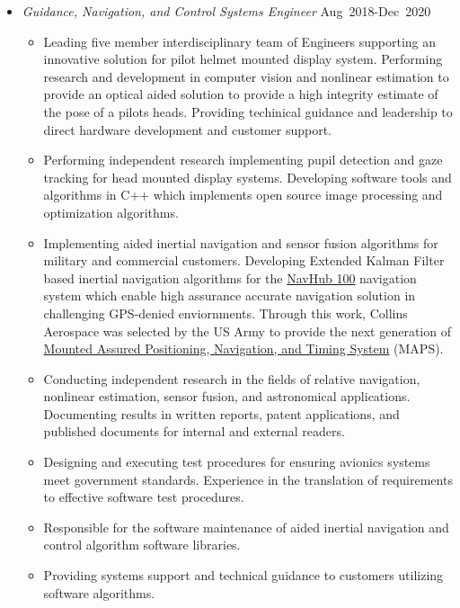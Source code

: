 \begin{itemize}
    \item[] \textit{Guidance, Navigation, and Control Systems Engineer}
                    \hfill {Aug~2018-Dec~2020} 
        \begin{itemize}
            \item Leading five member interdisciplinary team of Engineers supporting an innovative solution for pilot helmet mounted display system. 
                Performing research and development in computer vision and nonlinear estimation to provide an optical aided solution to provide a high integrity estimate of the pose of a pilots heads. 
                Providing techinical guidance and leadership to direct hardware development and customer support.
            \item Performing independent research implementing pupil detection and gaze tracking for head mounted display systems. 
                Developing software tools and algorithms in C++ which implements open source image processing and optimization algorithms.
            \item Implementing aided inertial navigation and sensor fusion algorithms for military and commercial customers. 
                Developing Extended Kalman Filter based inertial navigation algorithms for the \href{https://www.collinsaerospace.com/what-we-do/Military-And-Defense/Navigation/Ground-Products/NavHub-100-navigation-system}{NavHub 100} navigation system which enable high assurance accurate navigation solution in challenging GPS-denied enviornments.
                Through this work, Collins Aerospace was selected by the US Army to provide the next generation of \href{https://www.collinsaerospace.com/en/newsroom/News/2019/10/collins-next-gen-nav-system-selected-us-army-enable-critical-assured-pnt-contested-enviornments}{Mounted Assured Positioning, Navigation, and Timing System} (MAPS).
            \item Conducting independent research in the fields of relative navigation, nonlinear estimation, sensor fusion, and astronomical applications.
                Documenting results in written reports, patent applications, and published documents for internal and external readers. 
            \item Designing and executing test procedures for ensuring avionics systems meet government standards.
                Experience in the translation of requirements to effective software test procedures.
            \item Responsible for the software maintenance of aided inertial navigation and control algorithm software libraries. 
            \item Providing systems support and technical guidance to customers utilizing software algorithms.
        \end{itemize}
\end{itemize}

